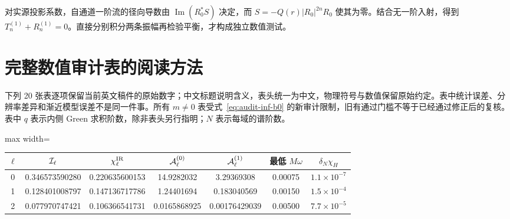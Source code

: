 \documentclass[UTF8,fontset=fandol,11pt,a4paper]{ctexart}
\newcommand{\Imm}{\operatorname{Im}}
\begin{document}
对实源投影系数，自通道一阶流的径向导数由 $\Imm(R_0^*S)$ 决定，而 $S=-Q(r)|R_0|^{2n}R_0$ 使其为零。结合无一阶入射，得到 $T_n^{(1)}+R_n^{(1)}=0$。直接分别积分两条振幅再检验平衡，才构成独立数值测试。

\section{完整数值审计表的阅读方法}
下列 20 张表逐项保留当前英文稿件的原始数字；中文标题说明含义，表头统一为中文，物理符号与数值保留原始约定。表中统计误差、分辨率差异和渐近模型误差不是同一件事。所有 $m\ne0$ 表受式~\eqref{eq:audit-inf-b0} 的新审计限制，旧有通过门槛不等于已经通过修正后的复核。表中 $q$ 表示内侧 Green 求积阶数，除非表头另行指明；$N$ 表示每域的谱阶数。
\par\addvspace{12pt}\noindent\begin{minipage}{\linewidth}
\centering\fontsize{9.5}{12}\selectfont\setlength{\tabcolsep}{3pt}\renewcommand{\arraystretch}{1.18}
\label{audit:tab:axisymmetric-infrared}
\begin{adjustbox}{max width=\linewidth}
\begin{tabular}{c c c c c c c}
\toprule
$\ell$ & ${\cal I}_\ell$ & $\chi^{\rm IR}_\ell$
& ${\cal A}^{(0)}_\ell$ & ${\cal A}^{(1)}_\ell$
& 最低 $M\omega$ & $\delta_N\chi_H$\\
\midrule
0 & 0.346573590280 & 0.220635600153 & 14.9282032 & 3.29369308 & 0.00075 & $1.1\times10^{-7}$\\
1 & 0.128401008797 & 0.147136717786 & 1.24401694 & 0.183040569 & 0.00150 & $1.5\times10^{-4}$\\
2 & 0.077970747421 & 0.106366541731 & 0.0165868925 & 0.00176429039 & 0.00500 & $7.7\times10^{-5}$\\
\bottomrule\end{tabular}\end{adjustbox}
\end{minipage}\par\addvspace{9pt}
\end{document}
